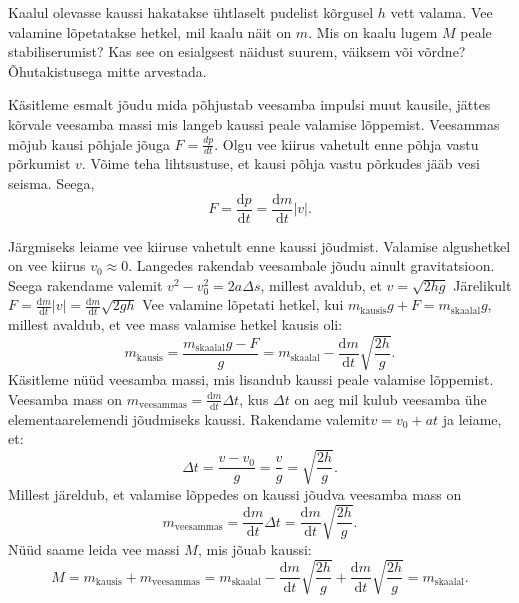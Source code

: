 
Kaalul olevasse kaussi hakatakse ühtlaselt pudelist kõrgusel $h$ vett valama. Vee valamine lõpetatakse hetkel, mil kaalu näit on $m$. Mis on kaalu lugem $M$ peale stabiliserumist? Kas see on esialgsest näidust suurem, väiksem või võrdne? Õhutakistusega mitte arvestada.




\hint

\solu
Käsitleme esmalt jõudu mida põhjustab veesamba impulsi muut kausile, jättes kõrvale veesamba massi mis langeb kaussi peale valamise lõppemist. Veesammas mõjub kausi põhjale jõuga $F=\frac{dp}{dt}$. Olgu vee kiirus vahetult enne põhja vastu põrkumist $v$. Võime teha lihtsustuse, et kausi põhja vastu põrkudes jääb vesi seisma. Seega,
\[
F=\frac{\mathrm{d}{p}}{\mathrm{d}{t}}=\frac{\mathrm{d}{m}}{\mathrm{d}{t}} |v|.
\]\par 
\noindent Järgmiseks leiame vee kiiruse vahetult enne kaussi jõudmist.  Valamise algushetkel on vee kiirus $v_0\approx 0$. Langedes rakendab veesambale jõudu ainult gravitatsioon. Seega rakendame valemit $v^2-v_0^2=2a\Delta s$, millest avaldub, et $v=\sqrt{2hg}$
Järelikult $F=\frac{\mathrm{d}{m}}{\mathrm{d}{t}} |v|=\frac{\mathrm{d}{m}}{\mathrm{d}{t}}\sqrt{2gh}$
Vee valamine lõpetati hetkel, kui $m_{\mathrm{kausis}} g+F=m_\mathrm{skaalal}g$, millest avaldub, et vee mass valamise hetkel kausis oli:
\begin{equation*}
m_{\mathrm{kausis}}=\frac{m_{\mathrm{skaalal}} g-F}{g}=m_{\mathrm{skaalal}}-\frac{\mathrm{d}{m}}{\mathrm{d}{t}}\sqrt{\frac{2h}{g}}.
\end{equation*}
Käsitleme nüüd veesamba massi, mis lisandub kaussi peale valamise lõppemist. Veesamba mass on $m_{\mathrm{veesammas}}=\frac{\mathrm{d}{m}}{\mathrm{d}{t}}\Delta t$, kus $\Delta t$ on aeg mil kulub veesamba ühe elementaarelemendi jõudmiseks kaussi. Rakendame valemit$v=v_0+at$ ja leiame, et:
\begin{equation*}
\Delta t = \frac{v-v_0}{g}=\frac{v}{g}=\sqrt{\frac{2h}{g}}.
\end{equation*}
Millest järeldub, et valamise lõppedes on kaussi jõudva veesamba mass on
\begin{equation*}
m_{\mathrm{veesammas}}=\frac{\mathrm{d}{m}}{\mathrm{d}{t}} \Delta t = \frac{\mathrm{d}{m}}{\mathrm{d}{t}}\sqrt{\frac{2h}{g}}.
\end{equation*}
Nüüd saame leida vee massi $M$, mis jõuab kaussi:
\begin{equation*}
M=m_{\mathrm{kausis}}+m_{\mathrm{veesammas}}=m_{\mathrm{skaalal}}-\frac{\mathrm{d}{m}}{\mathrm{d}{t}}\sqrt{\frac{2h}{g}}+\frac{\mathrm{d}{m}}{\mathrm{d}{t}}\sqrt{\frac{2h}{g}}=m_{\mathrm{skaalal}}.
\end{equation*}
\probend